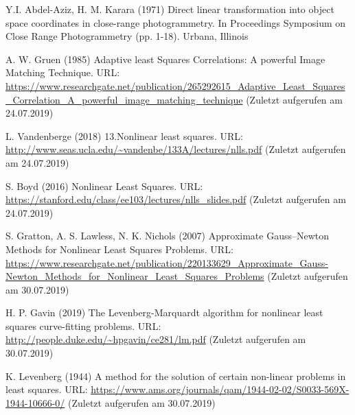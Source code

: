\documentclass[12pt,oneside]{scrreprt}
\begin{document}
\begin{thebibliography}{10}
 Y.I. Abdel-Aziz, H. M. Karara (1971) Direct linear transformation into object space coordinates in close-range photogrammetry. In Proceedings Symposium on Close Range Photogrammetry (pp. 1-18). Urbana, Illinois

 A. W. Gruen (1985) Adaptive least Squares Correlations:
A powerful Image Matching Technique. URL: \url{https://www.researchgate.net/publication/265292615_Adaptive_Least_Squares_Correlation_A_powerful_image_matching_technique}  (Zuletzt aufgerufen am 24.07.2019)

 L. Vandenberge (2018) 13.Nonlinear least squares. URL: \url{http://www.seas.ucla.edu/~vandenbe/133A/lectures/nlls.pdf} (Zuletzt aufgerufen am 24.07.2019)

 S. Boyd (2016) Nonlinear Least Squares. URL: \url{https://stanford.edu/class/ee103/lectures/nlls_slides.pdf} (Zuletzt aufgerufen am 24.07.2019)

 S. Gratton, A. S. Lawless, N. K. Nichols (2007) Approximate Gauss–Newton Methods for Nonlinear Least Squares Problems. URL: \url{https://www.researchgate.net/publication/220133629_Approximate_Gauss-Newton_Methods_for_Nonlinear_Least_Squares_Problems} (Zuletzt aufgerufen am 30.07.2019)

 H. P. Gavin (2019) The Levenberg-Marquardt algorithm for
nonlinear least squares curve-fitting problems. URL: \url{http://people.duke.edu/~hpgavin/ce281/lm.pdf} (Zuletzt aufgerufen am 30.07.2019)

 K. Levenberg (1944) A method for the solution of certain non-linear problems in least squares. URL: \url{https://www.ams.org/journals/qam/1944-02-02/S0033-569X-1944-10666-0/} (Zuletzt aufgerufen am 30.07.2019)


	\end{thebibliography}  
  \newpage
  
  \listoffigures
  \newpage
 
  
\end{document}
